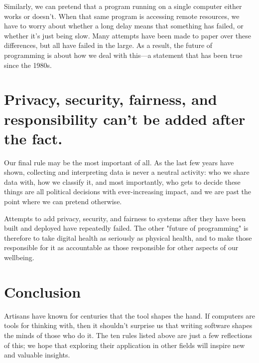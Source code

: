 \documentclass[10pt,letterpaper]{article}
\newcommand{\rulemajor}[1]{\section{#1}}
\begin{document}
Similarly, we can pretend that a program running on a single computer either
works or doesn't. When that same program is accessing remote resources, we have
to worry about whether a long delay means that something has failed, or whether
it's just being slow.  Many attempts have been made to paper over these
differences, but all have failed in the large.  As a result, the future of
programming is about how we deal with this---a statement that has been true
since the 1980s.

\rulemajor{Privacy, security, fairness, and responsibility can't be added after the fact.}

Our final rule may be the most important of all.  As the last few years have
shown, collecting and interpreting data is never a neutral activity: who we
share data with, how we classify it, and most importantly, who gets to decide
these things are all political decisions with ever-increasing impact, and we are
past the point where we can pretend otherwise.

Attempts to add privacy, security, and fairness to systems after they have been
built and deployed have repeatedly failed.  The other "future of programming" is
therefore to take digital health as seriously as physical health, and to make
those responsible for it as accountable as those responsible for other aspects
of our wellbeing.

\section*{Conclusion}

Artisans have known for centuries that the tool shapes the hand.  If computers
are tools for thinking with, then it shouldn't surprise us that writing software
shapes the minds of those who do it.  The ten rules listed above are just a few
reflections of this; we hope that exploring their application in other fields
will inspire new and valuable insights.


\end{document}
